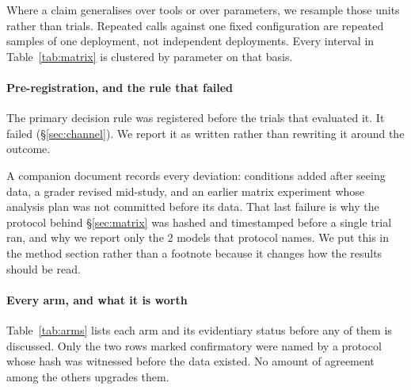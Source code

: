 \documentclass[letterpaper,twocolumn,10pt]{article}
\begin{document}
Where a claim generalises over tools or over parameters, we resample those units
rather than trials. Repeated calls against one fixed configuration are repeated
samples of one deployment, not independent deployments. Every interval in
Table~\ref{tab:matrix} is clustered by parameter on that basis.

\paragraph*{Pre-registration, and the rule that failed}
The primary decision rule was registered before the trials that evaluated it. It
failed (\S\ref{sec:channel}). We report it as written rather than rewriting it
around the outcome.

A companion document records every deviation: conditions added after seeing
data, a grader revised mid-study, and an earlier matrix experiment whose
analysis plan was not committed before its data. That last failure is why the
protocol behind \S\ref{sec:matrix} was hashed and timestamped before a single
trial ran, and why we report only the 2 models that protocol names. We put this
in the method section rather than a footnote because it changes how the results
should be read.

\paragraph*{Every arm, and what it is worth}
Table~\ref{tab:arms} lists each arm and its evidentiary status before any of
them is discussed. Only the two rows marked confirmatory were named by a
protocol whose hash was witnessed before the data existed. No amount of
agreement among the others upgrades them.
\end{document}
